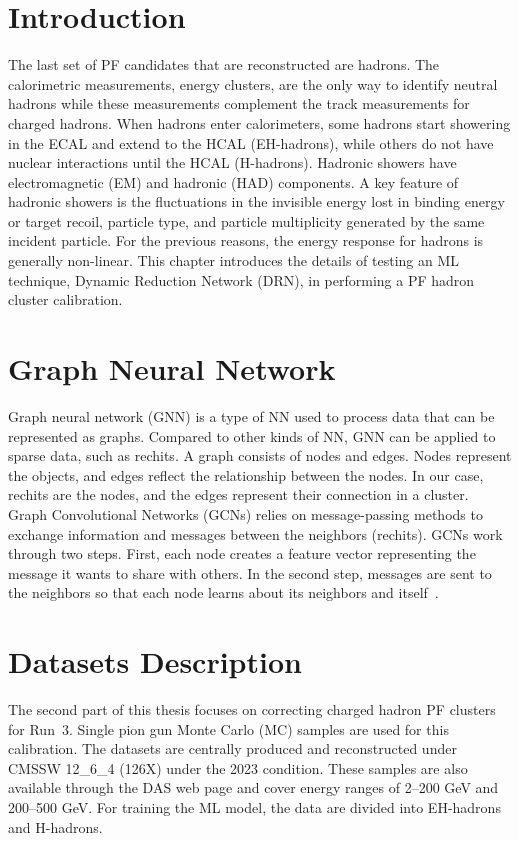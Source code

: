 \section{Introduction}
The last set of PF candidates that are reconstructed are hadrons. The calorimetric measurements, energy clusters, are the only way to identify neutral hadrons while these measurements complement the track measurements for charged hadrons. When hadrons enter calorimeters, some hadrons start showering in the ECAL and extend to the HCAL (EH-hadrons), while others do not have nuclear interactions until the HCAL (H-hadrons). Hadronic showers have electromagnetic (EM) and hadronic (HAD) components. A key feature of hadronic showers is the fluctuations in the invisible energy lost in binding energy or target recoil, particle type, and particle multiplicity generated by the same incident particle. %
For the previous reasons, the energy response for hadrons is generally non-linear.
This chapter introduces the details of testing an ML technique, Dynamic Reduction Network (DRN), in performing a PF hadron cluster calibration.


\section{Graph Neural Network} %
Graph neural network (GNN) is a type of NN used to process data that can be represented as graphs. Compared to other kinds of NN, GNN can be applied to sparse data, such as rechits. %
A graph consists of nodes and edges.
Nodes represent the objects, and edges reflect the relationship between the nodes.
In our case, rechits are the nodes, and the edges represent their connection in a cluster.
Graph Convolutional Networks (GCNs)%
relies on message-passing methods to exchange information and messages between the neighbors (rechits).
GCNs work through two steps. First, each node creates a feature vector representing the message it wants to share with others.
In the second step, messages are sent to the neighbors so that each node learns about its neighbors and itself~\cite{GNN}.

\section{Datasets Description}
The second part of this thesis focuses on correcting charged hadron PF clusters for Run~3.
Single pion gun Monte Carlo (MC) samples are used for this calibration.
The datasets are centrally produced and reconstructed under CMSSW 12\_6\_4 (126X) under the 2023 condition.
These samples are also available through the DAS web page and cover energy ranges of 2--200 GeV and 200--500 GeV.
For training the ML model, the data are divided into EH-hadrons and H-hadrons. %

